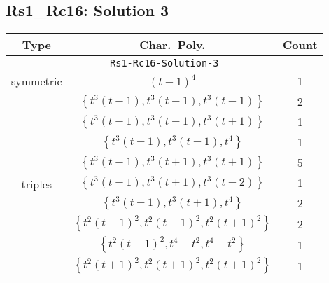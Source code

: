 \documentclass{article}
\begin{document}
        \subsection{Rs1\_Rc16: Solution 3}
        \begin{tabular}{|c|c|c|}
        \hline
        \textbf{Type} & \textbf{Char.~Poly.} & \textbf{Count} \\
        \hline \multicolumn{3}{|c|}{\texttt{Rs1-Rc16-Solution-3}} \\ \hline
        \multirow{1}{*}{symmetric}
        & $(t - 1)^4$ & 1 \\
        \hline
        \multirow{9}{*}{triples}
         & $\left\{t^3(t - 1),t^3(t - 1),t^3(t - 1)\right\}$ & 2 \\
         & $\left\{t^3(t - 1),t^3(t - 1),t^3(t + 1)\right\}$ & 1 \\
         & $\left\{t^3(t - 1),t^3(t - 1),t^4\right\}$ & 1 \\
         & $\left\{t^3(t - 1),t^3(t + 1),t^3(t + 1)\right\}$ & 5 \\
         & $\left\{t^3(t - 1),t^3(t + 1),t^3(t - 2)\right\}$ & 1 \\
         & $\left\{t^3(t - 1),t^3(t + 1),t^4\right\}$ & 2 \\
         & $\left\{t^2(t - 1)^2,t^2(t - 1)^2,t^2(t + 1)^2\right\}$ & 2 \\
         & $\left\{t^2(t - 1)^2,t^4 - t^2,t^4 - t^2\right\}$ & 1 \\
         & $\left\{t^2(t + 1)^2,t^2(t + 1)^2,t^2(t + 1)^2\right\}$ & 1 \\
        \hline
        \end{tabular}
        
        \newpage
        
\end{document}
